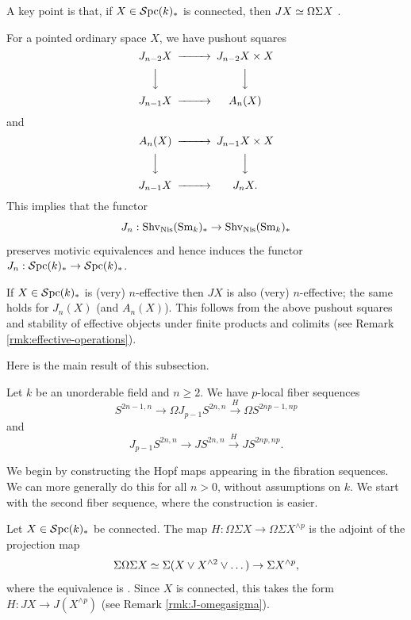 \documentclass{amsart}
\renewcommand{\NB}[1]{}
\numberwithin{proposition}{section}
\numberwithin{equation}{section}
\begin{document}
\begin{remark} \label{rmk:J-omegasigma}
A key point is that, if $X \in \mathcal{S}\mathrm{pc}{}(k)_*$ is connected, then $JX \simeq \Omega\Sigma X$ \cite[Theorem~2.4.2(1)]{asok2017simplicial}.
\end{remark}

\begin{remark} \label{rmk:Jn-functor}
For a pointed ordinary space $X$, we have pushout squares \cite[Construction~5.1]{devalapurkar2019james}
\begin{equation*}
\begin{CD}
J_{n-2} X @>>> J_{n-2} X \times X \\
@VVV               @VVV \\
J_{n-1} X @>>> A_n(X)
\end{CD}
\end{equation*}
and
\begin{equation*}
\begin{CD}
A_n(X) @>>> J_{n-1} X \times X \\
@VVV               @VVV \\
J_{n-1} X @>>> J_n X.
\end{CD}
\end{equation*}
This implies that the functor \[ J_n: \mathrm{S}\mathrm{hv}_{\mathrm{Nis}}({\mathrm{S}\mathrm{m}}_k)_* \to \mathrm{S}\mathrm{hv}_{\mathrm{Nis}}({\mathrm{S}\mathrm{m}}_k)_* \] preserves motivic equivalences and hence induces the functor $J_n: \mathcal{S}\mathrm{pc}{}(k)_* \to \mathcal{S}\mathrm{pc}{}(k)_*$.
\end{remark}

\begin{example} \label{ex:J-effective}
If $X \in \mathcal{S}\mathrm{pc}{}(k)_*$ is (very) $n$-effective then $JX$ is also (very) $n$-effective; the same holds for $J_n(X)$ (and $A_n(X)$).
This follows from the above pushout squares and stability of effective objects under finite products \cite[Lemma 3.1.8]{freudenthal} and colimits (see Remark \ref{rmk:effective-operations}).
\end{example}

Here is the main result of this subsection.
\begin{proposition} \label{prop:Toda-fibrations}
Let $k$ be an unorderable\NB{is this necessary?} field and $n \ge 2$.
We have $p$-local fiber sequences \[ S^{2n-1,n} \to \Omega J_{p-1} S^{2n,n} \xrightarrow{H} \Omega S^{2np-1,np} \] and \[ J_{p-1}S^{2n,n} \to J S^{2n,n} \xrightarrow{H} JS^{2np,np}. \]
\end{proposition}

We begin by constructing the Hopf maps appearing in the fibration sequences.
We can more generally do this for all $n > 0$, without assumptions on $k$.
We start with the second fiber sequence, where the construction is easier.
\begin{construction} \label{cons:H-2}
Let $X \in \mathcal{S}\mathrm{pc}{}(k)_*$ be connected.
The map $H: \Omega \Sigma X \to \Omega \Sigma X^{\wedge p}$ is the adjoint of the projection map \[ \Sigma \Omega \Sigma X \simeq \Sigma(X \vee X^{\wedge 2} \vee \dots) \to \Sigma X^{\wedge p}, \] where the equivalence is \cite[\S4.2]{devalapurkar2019james}.
Since $X$ is connected, this takes the form $H: JX \to J(X^{\wedge p})$ (see Remark \ref{rmk:J-omegasigma}).
\end{construction}
\end{document}
